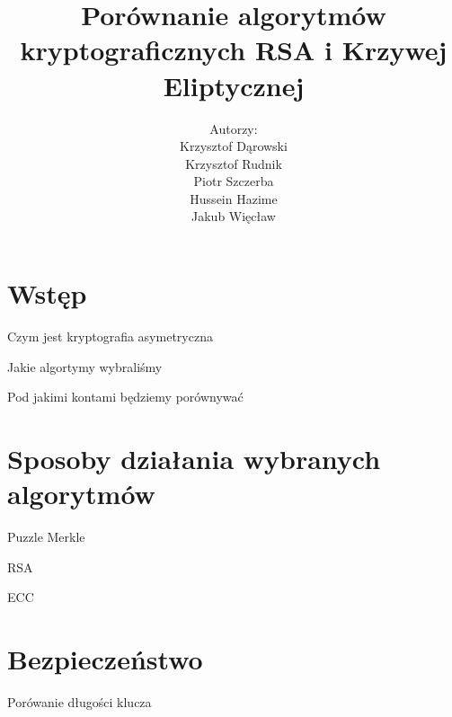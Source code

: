 \documentclass{beamer}
\title{Porównanie algorytmów kryptograficznych RSA i Krzywej Eliptycznej}
\author{Autorzy:\\ Krzysztof Dąrowski\\ Krzysztof Rudnik\\ Piotr Szczerba\\ Hussein Hazime\\ Jakub Więcław}
\date{}
\begin{document}
\begin{frame}
    \titlepage
\end{frame}

\section{Wstęp}
\begin{frame}{Czym jest kryptografia asymetryczna}
\end{frame}

\begin{frame}{Jakie algortymy wybraliśmy}
    
\end{frame}
\begin{frame}{Pod jakimi kontami będziemy porównywać}
    
\end{frame}

\section{Sposoby działania wybranych algorytmów}
\begin{frame}{Puzzle Merkle} %
    
\end{frame}


\begin{frame}{RSA}
    
\end{frame}



\begin{frame}{ECC}
    
\end{frame}




\section{Bezpieczeństwo}

\begin{frame}{Porówanie długości klucza}
\end{frame}
\end{document}
